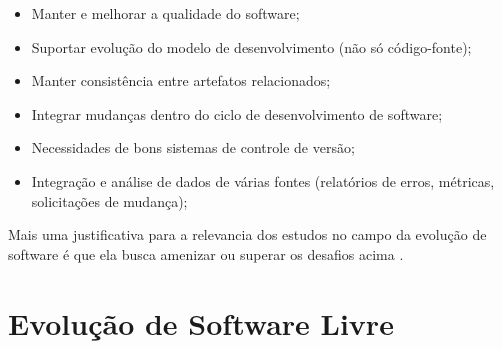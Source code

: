 \begin{itemize}
\item Manter e melhorar a qualidade do software;
\item Suportar evolução do modelo de desenvolvimento (não só código-fonte);
\item Manter consistência entre artefatos relacionados;
\item Integrar mudanças dentro do ciclo de desenvolvimento de software;
\item Necessidades de bons sistemas de controle de versão;
\item Integração e análise de dados de várias fontes (relatórios de erros, métricas, solicitações de mudança);
\end{itemize}

Mais uma justificativa para a relevancia dos estudos no campo da evolução de software é que ela busca amenizar ou superar os desafios acima \cite{mens2005challenges}.

\section{Evolução de Software Livre}





